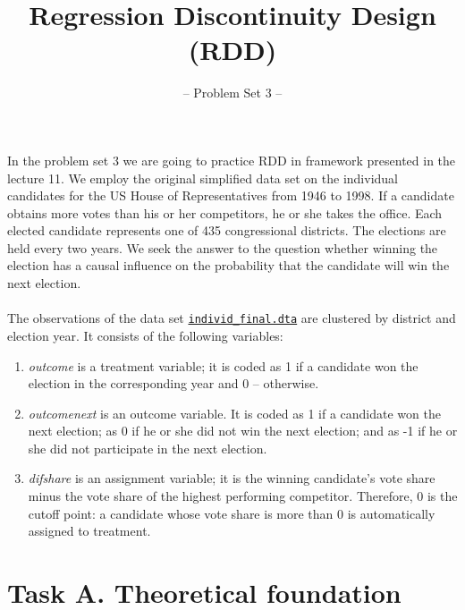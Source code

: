 

\title{Regression Discontinuity Design (RDD)}
\subtitle{-- Problem Set 3 --}
\date{}

\maketitle\vspace{-2cm}

In the problem set 3 we are going to practice RDD in \cite{Lee.2008} framework presented in the lecture 11. We employ the original simplified data set on the individual candidates for the US House of Representatives from 1946 to 1998. If a candidate obtains more votes than his or her competitors, he or she takes the office.  Each elected candidate represents one of 435 congressional districts. The elections are held every two years. We seek the answer to the question whether winning the election has a causal influence on the probability that the candidate will win the next election.\\
\\
The observations of the data set \href{https://github.com/HumanCapitalAnalysis/microeconometrics/tree/master/problem-sets/03-regression-discontinuity-design/data}{\texttt{individ\_final.dta}} are clustered by district and election year. It consists of the following variables:
\begin{enumerate}

\item \emph{outcome} is a treatment variable; it is coded as 1 if a candidate won the election in the corresponding year and 0 -- otherwise. 
\item \emph{outcomenext} is an outcome variable. It is coded as 1 if a candidate won the next election; as 0 if he or she did not win the next election; and as -1 if he or she did not participate in the next election. 
\item \emph{difshare} is an assignment variable; it is the winning candidate's vote share minus the vote share of the highest performing competitor. Therefore, 0 is the cutoff point: a candidate whose vote share is more than 0 is automatically assigned to treatment.

\end {enumerate}

\section*{Task A. Theoretical foundation} 

